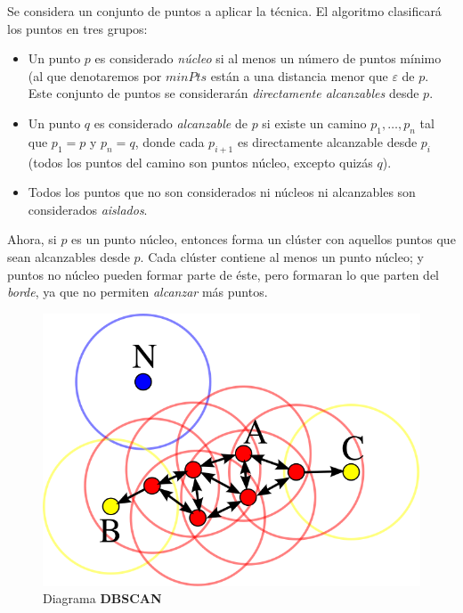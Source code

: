 \documentclass[a4paper, 12pt]{article}
\begin{document}
Se considera un conjunto de puntos a aplicar la t\'ecnica. El algoritmo clasificar\'a los puntos en tres grupos: 

\begin{itemize}
	\item Un punto $p$ es considerado \textit{n\'ucleo} si al menos un n\'umero de puntos m\'inimo (al que denotaremos por $minPts$ est\'an a una distancia menor que $\varepsilon$ de $p$. Este conjunto de puntos se considerar\'an \textit{directamente alcanzables} desde $p$.
	\item Un punto $q$ es considerado \textit{alcanzable} de $p$ si existe un camino $p_1, \ldots, p_n$ tal que $p_1=p$ y $p_n=q$, donde cada $p_{i+1}$ es directamente alcanzable desde $p_i$ (todos los puntos del camino son puntos n\'ucleo, excepto quiz\'as $q$).
	\item Todos los puntos que no son considerados ni n\'ucleos ni alcanzables son considerados \textit{aislados}.
\end{itemize}

Ahora, si $p$ es un punto n\'ucleo, entonces forma un cl\'uster con aquellos puntos que sean alcanzables desde $p$. Cada cl\'uster contiene al menos un punto n\'ucleo; y puntos no n\'ucleo pueden formar parte de \'este, pero formaran lo que parten del \textit{borde}, ya que no permiten \textit{alcanzar} m\'as puntos. \\

\begin{figure}[H]\label{fig:DBSCAN}
	\centering
	\includegraphics[scale=.5]{DBSCAN.png}
\caption{Diagrama \textbf{DBSCAN}}
\end{figure}
\end{document}
